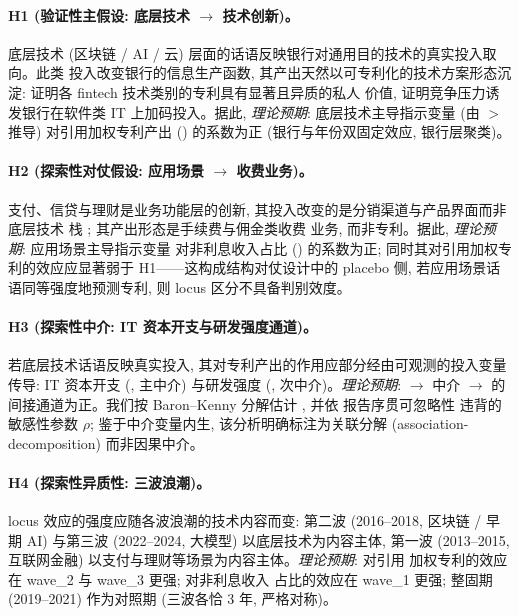 \paragraph{H1 (验证性主假设: 底层技术 $\to$ 技术创新)。}
底层技术 (区块链 / AI / 云) 层面的话语反映银行对通用目的技术的真实投入取向。此类
投入改变银行的信息生产函数, 其产出天然以可专利化的技术方案形态沉淀:
\textcite{chen2019fintechvalue} 证明各 fintech 技术类别的专利具有显著且异质的私人
价值, \textcite{he2026lendingit} 证明竞争压力诱发银行在软件类 IT 上加码投入。据此,
\emph{理论预期}: 底层技术主导指示变量  (由
 $>$  推导) 对引用加权专利产出
() 的系数为正 (银行与年份双固定效应, 银行层聚类)。

\paragraph{H2 (探索性对仗假设: 应用场景 $\to$ 收费业务)。}
支付、信贷与理财是业务功能层的创新, 其投入改变的是分销渠道与产品界面而非底层技术
栈 \parencite{parlour2022payments,boot2021fintech}; 其产出形态是手续费与佣金类收费
业务, 而非专利。据此, \emph{理论预期}: 应用场景主导指示变量
 对非利息收入占比 ()
的系数为正; 同时其对引用加权专利的效应应显著弱于 H1——这构成结构对仗设计中的
placebo 侧, 若应用场景话语同等强度地预测专利, 则 locus 区分不具备判别效度。

\paragraph{H3 (探索性中介: IT 资本开支与研发强度通道)。}
若底层技术话语反映真实投入, 其对专利产出的作用应部分经由可观测的投入变量传导:
IT 资本开支 (, 主中介) 与研发强度 (,
次中介)。\emph{理论预期}:  $\to$ 中介 $\to$
 的间接通道为正。我们按 Baron--Kenny 分解估计
\parencite{baron1986moderator}, 并依 \textcite{imai2010general} 报告序贯可忽略性
违背的敏感性参数 $\rho$; 鉴于中介变量内生, 该分析明确标注为关联分解
(association-decomposition) 而非因果中介。

\paragraph{H4 (探索性异质性: 三波浪潮)。}
locus 效应的强度应随各波浪潮的技术内容而变: 第二波 (2016--2018, 区块链 / 早期 AI)
与第三波 (2022--2024, 大模型) 以底层技术为内容主体, 第一波 (2013--2015, 互联网金融)
以支付与理财等场景为内容主体。\emph{理论预期}:  对引用
加权专利的效应在 wave\_2 与 wave\_3 更强;  对非利息收入
占比的效应在 wave\_1 更强; 整固期 (2019--2021) 作为对照期 (三波各恰 3 年, 严格对称)。

